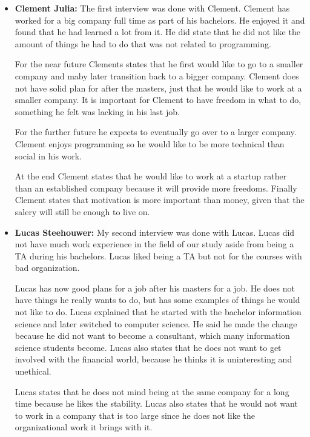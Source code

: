 \documentclass[]{article}
\begin{document}
\begin{itemize}
    \item[] \textbf{Clement Julia: }
    The first interview was done with Clement. Clement has worked for a big company
    full time as part of his bachelors. He enjoyed it and found that he had learned a lot 
    from it. He did state that he did not like the amount of things he had to do 
    that was not related to programming.

    For the near future Clements states that he first would like to go to a smaller
    company and maby later transition back to a bigger company. Clement does not
    have solid plan for after the masters, just that he would like to work at 
    a smaller company. It is important for Clement to have freedom in what to do,
    something he felt was lacking in his last job. 

    For the further future he expects to eventually go over to a larger company.
    Clement enjoys programming so he would like to be more technical than social 
    in his work. 

    At the end Clement states that he would like to work at a startup rather 
    than an established company because it will provide more freedoms. 
    Finally Clement states that motivation is more important than money, 
    given that the salery will still be enough to live on. 
    
    \item[] \textbf{Lucas Steehouwer: }  
    My second interview was done with Lucas. Lucas did not have much work experience
    in the field of our study aside from being a TA during his bachelors. 
    Lucas liked being a TA but not for the courses with bad organization.  

    Lucas has now good plans for a job after his masters for a job. 
    He does not have things he really wants to do, but has some examples of things 
    he would not like to do. Lucas explained that he started with the bachelor 
    information science and later switched to computer science. He said he 
    made the change because he did not want to become a consultant, which 
    many information science students become. Lucas also states that he does not 
    want to get involved with the financial world, because he thinks it is 
    uninteresting and unethical. 

    Lucas states that he does not mind being at the same company for a long time
    because he likes the stability. Lucas also states that he would not want to 
    work in a company that is too large since he does not like the organizational 
    work it brings with it.

\end{itemize}
\end{document}
